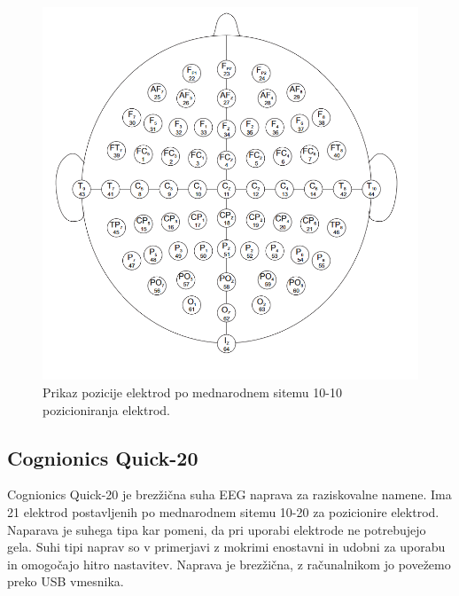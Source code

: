 \begin{figure}[h!]
        \begin{center}
        \includegraphics[width=1\linewidth]{slike/64electrodeSystem.png}
        \end{center}
        \caption{Prikaz pozicije elektrod po mednarodnem sitemu 10-10 pozicioniranja elektrod.  \cite{HttpsWwwPhysionet}}
        \label{slika:mednarodni_sistem_10}
        \end{figure}

\subsection{Cognionics Quick-20}
Cognionics Quick-20 je brezžična suha EEG naprava za raziskovalne namene. Ima 21 elektrod postavljenih po mednarodnem sitemu 10-20 za pozicionire elektrod. Naparava je suhega tipa kar pomeni, da pri uporabi elektrode ne potrebujejo gela. Suhi tipi naprav so v primerjavi z mokrimi enostavni in udobni za uporabu in omogočajo hitro nastavitev. Naprava je brezžična, z računalnikom jo povežemo preko USB vmesnika. \cite{DryEEGHeadset}

